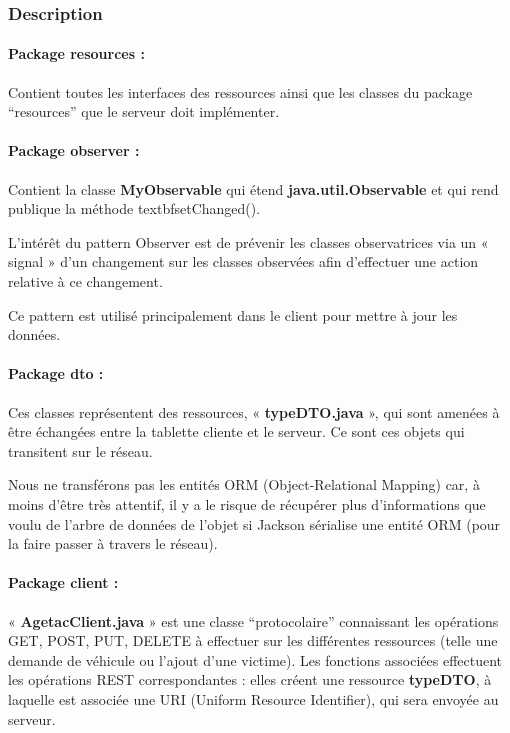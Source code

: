 \documentclass{article}
\begin{document}
\newpage
\subsubsection{Description}

\paragraph{Package resources :}

Contient toutes les interfaces des ressources ainsi que les classes du package “resources” que le serveur doit implémenter.

\paragraph{Package observer :}

Contient la classe \textbf{MyObservable} qui étend \textbf{java.util.Observable} et qui rend publique la méthode textbf{setChanged()}.

L'intérêt du pattern Observer est de prévenir les classes observatrices via un « signal » d'un changement sur les classes observées afin d'effectuer une action relative à ce changement.

Ce pattern est utilisé principalement dans le client pour mettre à jour les données.

\paragraph{Package dto :}

Ces classes représentent des ressources, « \textbf{typeDTO.java} », qui sont amenées à être échangées entre la tablette cliente et le serveur. Ce sont ces objets qui transitent sur le réseau.

Nous ne transférons pas les entités ORM (Object-Relational Mapping) car, à moins d’être très attentif, il y a le risque de récupérer plus d’informations que voulu de l’arbre de données de l’objet si Jackson sérialise une entité ORM (pour la faire passer à travers le réseau).

\paragraph{Package client :}

« \textbf{AgetacClient.java} » est une classe “protocolaire” connaissant les opérations GET, POST, PUT, DELETE à effectuer sur les différentes ressources (telle une demande de véhicule ou l'ajout d'une victime). Les fonctions associées effectuent les opérations REST correspondantes : elles créent une ressource \textbf{typeDTO}, à laquelle est associée une URI (Uniform Resource Identifier), qui sera envoyée au serveur.
\end{document}
